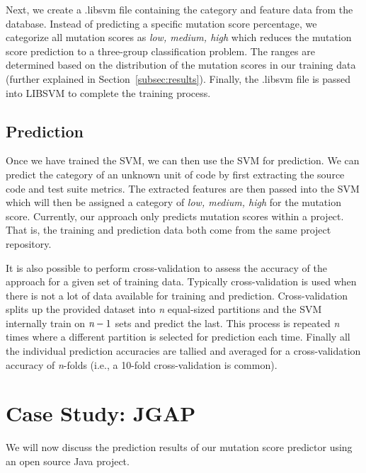 \documentclass[conference]{IEEEtran}
\begin{document}
Next, we create a .libsvm file containing the category and feature data from the database. Instead of predicting a specific mutation score percentage, we categorize all mutation scores as \textit{low, medium, high} which reduces the mutation score prediction to a three-group classification problem. The ranges are determined based on the distribution of the mutation scores in our training data (further explained in Section~\ref{subsec:results}). Finally, the .libsvm file is passed into LIBSVM to complete the training process.


\subsection{Prediction}
\label{subsec:prediction}
Once we have trained the SVM, we can then use the SVM for prediction. We can predict the category of an unknown unit of code by first extracting the source code and test suite metrics. The extracted features are then passed into the SVM which will then be assigned a category of \textit{low, medium, high} for the mutation score.  Currently, our approach only predicts mutation scores within a project. That is, the training and prediction data both come from the same project repository.

It is also possible to perform cross-validation to assess the accuracy of the approach for a given set of training data. Typically cross-validation is used when there is not a lot of data available for training and prediction. Cross-validation splits up the provided dataset into \emph{n} equal-sized partitions and the SVM internally train on $\emph{n}-1$ sets and predict the last. This process is repeated \emph{n} times where a different partition is selected for prediction each time. Finally all the individual prediction accuracies are tallied and averaged for a cross-validation accuracy of \emph{n}-folds (i.e., a 10-fold cross-validation is common).


\section{Case Study: JGAP}
\label{sec:case_study}
We will now discuss the prediction results of our mutation score predictor using an open source Java project.
\end{document}
